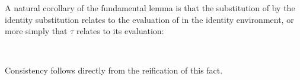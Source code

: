 \documentclass[sigplan,screen]{acmart}
\begin{document}
A natural corollary of the fundamental lemma is that the substitution of  by the identity substitution  relates to the evaluation of  in the identity environment, or more simply that $\tau$ relates to its evaluation:

\begin{AgdaAlign}
\begin{code}%
%
\>[2]\AgdaSpace{}%
\AgdaSymbol{:}\AgdaSpace{}%
\AgdaSymbol{(}\AgdaSpace{}%
\AgdaSymbol{:}\AgdaSpace{}%
\AgdaSpace{}%
\AgdaSpace{}%
\AgdaSymbol{)}\AgdaSpace{}%
\AgdaSpace{}%
\AgdaSpace{}%
\AgdaSpace{}%
\AgdaSpace{}%
\AgdaSpace{}%
\AgdaSpace{}%
\AgdaSpace{}%
\<%
\end{code}
\begin{code}[hide]%
%
\>[2]\AgdaSpace{}%
\AgdaSpace{}%
\AgdaSpace{}%
\AgdaSymbol{=}\AgdaSpace{}%
\AgdaSpace{}%
\AgdaSymbol{(}\AgdaSpace{}%
\AgdaSpace{}%
\AgdaSpace{}%
\AgdaSpace{}%
\AgdaSymbol{)}\<%
\\
\>[2][@{}l@{\AgdaIndent{0}}]%
\>[4]\AgdaSymbol{(}\AgdaSpace{}%
\AgdaSymbol{)}\AgdaSpace{}%
\AgdaSymbol{(}\AgdaSpace{}%
\AgdaSpace{}%
\AgdaSymbol{)}\<%
\end{code}
\end{AgdaAlign}

\Ni Consistency follows directly from the reification of this fact.
\begin{AgdaAlign}
\begin{code}%
%
\>[2]\AgdaSpace{}%
\AgdaSymbol{:}\AgdaSpace{}%
\AgdaSymbol{(}\AgdaSpace{}%
\AgdaSymbol{:}\AgdaSpace{}%
\AgdaSpace{}%
\AgdaSpace{}%
\AgdaSymbol{)}\AgdaSpace{}%
\AgdaSpace{}%
\AgdaSpace{}%
\AgdaSpace{}%
\AgdaSpace{}%
\AgdaSymbol{(}\AgdaSpace{}%
\AgdaSymbol{)}\<%
\\
%
\>[2]\AgdaSpace{}%
\AgdaSymbol{=}\AgdaSpace{}%
\AgdaSpace{}%
\AgdaSpace{}%
\<%
\end{code}
\end{AgdaAlign}
\end{document}
